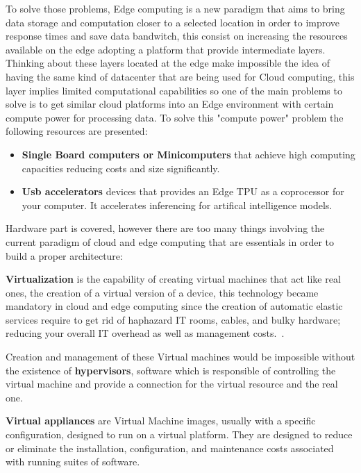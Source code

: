 To solve those problems, Edge computing is a new paradigm that aims to bring data storage and computation closer to a selected location in order to improve response times and save data bandwitch, this consist on increasing the resources available on the edge adopting a platform that provide intermediate layers.
Thinking about these layers located at the edge make impossible the idea of having the same kind of datacenter that are being used for Cloud computing, this layer implies limited computational capabilities so one of the main problems to solve is to get similar cloud platforms into an Edge environment with certain compute power for processing data.
To solve this "compute power" problem the following resources are presented:

\begin{itemize}
  \item \textbf{Single Board computers or Minicomputers} that achieve high computing capacities reducing costs and size significantly.
  \item \textbf{Usb accelerators} devices that provides an Edge TPU as a coprocessor for your computer. It accelerates inferencing for artifical intelligence models.
\end{itemize}

Hardware part is covered, however there are too many things involving the current paradigm of cloud and edge computing that are essentials in order to build a proper architecture:

\textbf{Virtualization} is the capability of creating virtual machines that act like real ones, the creation of a virtual version of a device, this technology became mandatory in cloud and edge computing since the creation of automatic elastic services require to get rid of haphazard IT rooms, cables, and bulky hardware; reducing your overall IT overhead as well as management costs.~\cite{virt_def}.

Creation and management of these Virtual machines would be impossible without the existence of \textbf{hypervisors}, software which is responsible of controlling the virtual machine and provide a connection for the virtual resource and the real one.

\textbf{Virtual appliances} are Virtual Machine images, usually with a specific configuration, designed to run on a virtual platform. They are designed to reduce or eliminate the installation, configuration, and maintenance costs associated with running suites of software.~\cite{GEN:Virtualization:2010}

